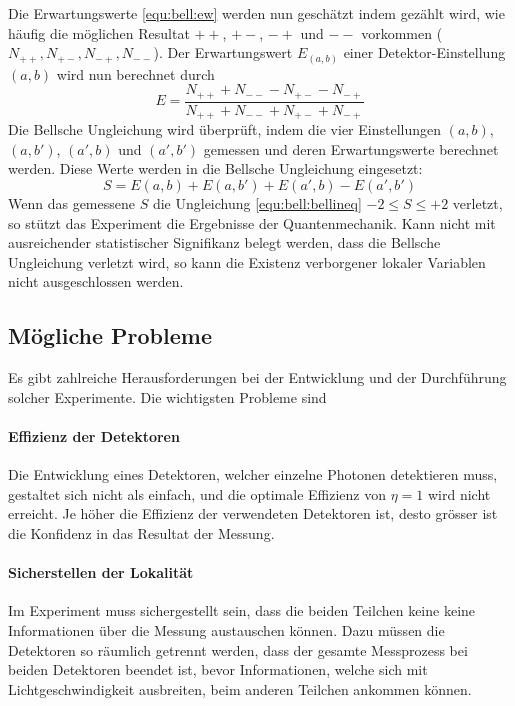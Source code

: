 \begin{refsection}
Die Erwartungswerte \eqref{equ:bell:ew} werden nun gesch\"atzt indem gez\"ahlt
wird, wie h\"aufig die m\"oglichen Resultat $++$, $+-$, $-+$ und $--$
vorkommen ($N_{++}, N_{+-}, N_{-+}, N_{--}$).
Der Erwartungswert $E_(a,b)$ einer Detektor-Einstellung $(a,b)$ wird
nun berechnet durch
\begin{equation}
    E = \frac{N_{++} + N_{--} - N_{+-} - N_{-+}}{N_{++} + N_{--} + N_{+-} + N_{-+}}
\end{equation}
Die Bellsche Ungleichung wird \"uberpr\"uft, indem die vier Einstellungen
$(a,b)$, $(a,b')$, $(a',b)$ und $(a',b')$ gemessen und deren Erwartungswerte
berechnet werden. 
Diese Werte werden in die Bellsche Ungleichung eingesetzt:
\begin{equation}
    S = E(a,b) + E(a,b') + E(a',b) - E(a',b')
\end{equation}
Wenn das gemessene $S$ die Ungleichung \eqref{equ:bell:bellineq} 
$-2 \leq S \leq +2$
verletzt, so st\"utzt das Experiment die Ergebnisse der Quantenmechanik.
Kann nicht mit ausreichender statistischer Signifikanz belegt werden, dass
die Bellsche Ungleichung verletzt wird, so kann die Existenz verborgener
lokaler Variablen nicht ausgeschlossen werden.

\subsection{M\"ogliche Probleme}
Es gibt zahlreiche Herausforderungen bei der Entwicklung und der Durchf\"uhrung
solcher Experimente.
Die wichtigsten Probleme sind

\paragraph{Effizienz der Detektoren}
Die Entwicklung eines Detektoren, welcher einzelne Photonen detektieren muss,
gestaltet sich nicht als einfach, und die optimale Effizienz von $\eta = 1$ wird
nicht erreicht.
Je h\"oher die Effizienz der verwendeten Detektoren ist, desto gr\"osser ist die
Konfidenz in das Resultat der Messung. 

\paragraph{Sicherstellen der Lokalit\"at}
Im Experiment muss sichergestellt sein, dass die beiden Teilchen keine
keine Informationen \"uber die Messung austauschen k\"onnen.
Dazu m\"ussen die Detektoren so r\"aumlich getrennt werden, dass
der gesamte Messprozess bei beiden Detektoren beendet ist, bevor Informationen,
welche sich mit Lichtgeschwindigkeit ausbreiten, beim anderen Teilchen
ankommen k\"onnen. 


\end{refsection}
